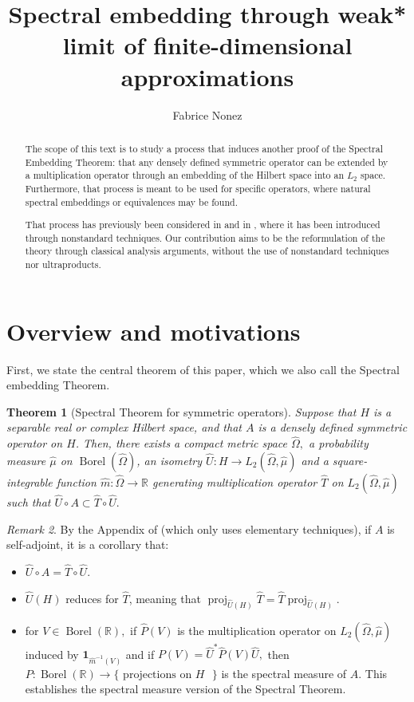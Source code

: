 \documentclass{amsart}
\title{Spectral embedding through weak* limit of finite-dimensional approximations}
\author{Fabrice Nonez}
\newtheorem{thm}{Theorem}[section]
\theoremstyle{definition}
\theoremstyle{remark}
\newtheorem{remark}[thm]{Remark}
\def \Proj{\operatorname{proj}}
\def \Borel{\operatorname{Borel}}
\def \HOM{\hat{\Omega}}
\def \HMU{\hat{\mu}}
\def \HU{\hat{U}}
\def \HT{\hat{T}}
\def \Hm{\hat{m}}
\begin{document}
\begin{abstract}    
The scope of this text is to study a process that induces another proof of the Spectral Embedding Theorem: that any densely defined symmetric operator can be extended by a multiplication operator through an embedding of the Hilbert space into an $L_2$ space. Furthermore, that process is meant to be used for specific operators, where natural spectral embeddings or equivalences may be found.

That process has previously been considered in \cite{nonez2024spectralequivalencesnonstandardsamplings} and in \cite{goldbring2025nonstandardapproachdirectintegral}, where it has been introduced through nonstandard techniques. Our contribution aims to be the reformulation of the theory through classical analysis arguments, without the use of nonstandard techniques nor ultraproducts.
\end{abstract}
\maketitle
\section{Overview and motivations}

First, we state the central theorem of this paper, which we also call the Spectral embedding Theorem.
\begin{thm}[Spectral Theorem for symmetric operators]\label{theorem_spectral_embedding}
	Suppose that $H$ is a separable real or complex Hilbert space, and that $A$ is a densely defined symmetric operator on $H$. Then, there exists a compact metric space $\HOM,$ a probability measure $\HMU$ on $\Borel(\HOM)$, an isometry $\HU:H\rightarrow L_2(\HOM,\HMU)$ and a square-integrable function $\Hm:\HOM\rightarrow\mathbb{R}$ generating multiplication operator $\HT$ on $L_2(\HOM,\HMU)$ such that $\HU\circ A \subset \HT\circ \HU.$
\end{thm}
\begin{remark}
	By the Appendix of \cite{nonez2024spectralequivalencesnonstandardsamplings} (which only uses elementary techniques), if $A$ is self-adjoint, it is a corollary that:
	\begin{itemize}
		\item $\HU\circ A = \HT\circ \HU.$ 
		\item $\HU(H)$ reduces for $\HT$, meaning that $\Proj_{\HU(H)} \HT=\HT\Proj_{\HU(H)}$.
		\item for $V\in\operatorname{Borel}(\mathbb{R}),$ if $\hat{P}(V)$ is the multiplication operator on $L_2(\HOM,\HMU)$ induced by $\mathbf{1}_{\Hm^{-1}(V)}$ and if $P(V)=\HU^* \hat{P}(V) \HU,$ then $P:\operatorname{Borel}(\mathbb{R})\rightarrow\{\text{ projections on $H$ } \}$ is the spectral measure of $A$. This establishes the spectral measure version of the Spectral Theorem.
	\end{itemize}
\end{remark}
\end{document}
